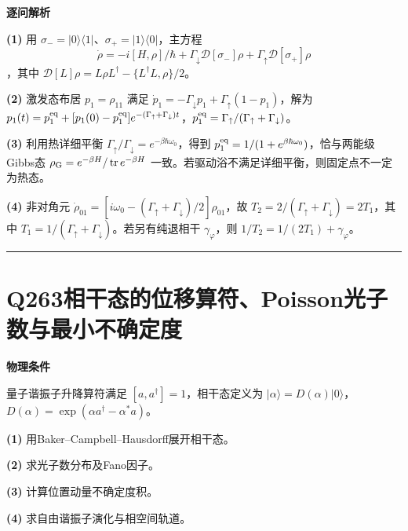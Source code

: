 \documentclass[UTF8,a4paper,11pt,oneside,openany]{ctexbook}
\begin{document}
\par\medskip\noindent\textbf{逐问解析}
\par\noindent\textbf{(1)} 用 \(\sigma_-=|0\rangle\langle1|\)、\(\sigma_+=|1\rangle\langle0|\)，主方程 \[\dot\rho=-i[H,\rho]/\hbar+\Gamma_\downarrow\mathcal D[\sigma_-]\rho+\Gamma_\uparrow\mathcal D[\sigma_+]\rho\]，其中 \(\mathcal D[L]\rho=L\rho L^\dagger-\{L^\dagger L,\rho\}/2\)。
\par\noindent\textbf{(2)} 激发态布居 \(p_1=\rho_{11}\) 满足 \(\dot p_1=-\Gamma_\downarrow p_1+\Gamma_\uparrow(1-p_1)\)，解为 \(p_1(t)=p_1^{\rm eq}+[p_1(0)-p_1^{\rm eq}]e^{-(\Gamma_\uparrow+\Gamma_\downarrow)t}\)，\(p_1^{\rm eq}=\Gamma_\uparrow/(\Gamma_\uparrow+\Gamma_\downarrow)\)。
\par\noindent\textbf{(3)} 利用热详细平衡 \(\Gamma_\uparrow/\Gamma_\downarrow=e^{-\beta\hbar\omega_0}\)，得到 \(p_1^{\rm eq}=1/(1+e^{\beta\hbar\omega_0})\)，恰与两能级Gibbs态 \(\rho_{\rm G}=e^{-\beta H}/\operatorname{tr}e^{-\beta H}\) 一致。若驱动浴不满足详细平衡，则固定点不一定为热态。
\par\noindent\textbf{(4)} 非对角元 \(\dot\rho_{01}=[i\omega_0-(\Gamma_\uparrow+\Gamma_\downarrow)/2]\rho_{01}\)，故 \(T_2=2/(\Gamma_\uparrow+\Gamma_\downarrow)=2T_1\)，其中 \(T_1=1/(\Gamma_\uparrow+\Gamma_\downarrow)\)。若另有纯退相干 \(\gamma_\varphi\)，则 \(1/T_2=1/(2T_1)+\gamma_\varphi\)。

\par\bigskip\hrule\bigskip
\section*{Q263\quad 相干态的位移算符、Poisson光子数与最小不确定度}
\textbf{物理条件}\par 量子谐振子升降算符满足 \([a,a^\dagger]=1\)，相干态定义为 \(|\alpha\rangle=D(\alpha)|0\rangle\)，\(D(\alpha)=\exp(\alpha a^\dagger-\alpha^*a)\)。
\par\noindent\textbf{(1)} 用Baker–Campbell–Hausdorff展开相干态。
\par\noindent\textbf{(2)} 求光子数分布及Fano因子。
\par\noindent\textbf{(3)} 计算位置动量不确定度积。
\par\noindent\textbf{(4)} 求自由谐振子演化与相空间轨道。
\end{document}
